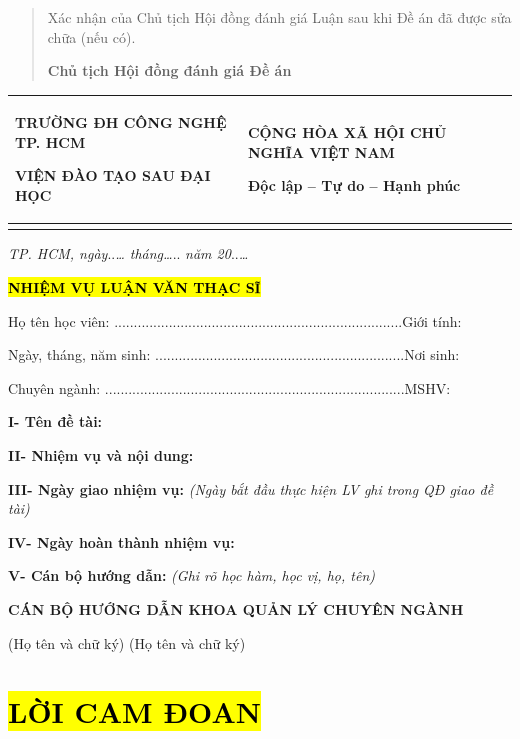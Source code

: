 \documentclass[
]{article}
\newcounter{none} %
\begin{document}
\begin{quote}
Xác nhận của Chủ tịch Hội đồng đánh giá Luận sau khi Đề án đã được sửa
chữa (nếu có).

\textbf{Chủ tịch Hội đồng đánh giá Đề án}
\end{quote}

{\def\LTcaptype{none} %
\begin{longtable}[]{@{}
  >{\raggedright\arraybackslash}p{}
  >{\raggedright\arraybackslash}p{}@{}}
\toprule\noalign{}
\begin{minipage}[b]{\linewidth}\centering
TRƯỜNG ĐH CÔNG NGHỆ TP. HCM

\textbf{VIỆN ĐÀO TẠO SAU ĐẠI HỌC}
\end{minipage} & \begin{minipage}[b]{\linewidth}\centering
\textbf{CỘNG HÒA XÃ HỘI CHỦ NGHĨA VIỆT NAM}

\textbf{Độc lập -- Tự do -- Hạnh phúc}
\end{minipage} \\
\midrule\noalign{}
\endhead
\bottomrule\noalign{}
\endlastfoot
\end{longtable}
}

\emph{TP. HCM, ngày}..\emph{\ldots{} tháng\ldots{}}.. \emph{năm
20}..\emph{\ldots{}}

\textbf{\hl{NHIỆM VỤ LUẬN VĂN THẠC SĨ}}

Họ tên học viên:
..........................................................................Giới
tính:

Ngày, tháng, năm sinh:
................................................................Nơi
sinh:

Chuyên ngành:
.............................................................................MSHV:

\textbf{I- Tên đề tài:}

\textbf{II- Nhiệm vụ và nội dung:}

\textbf{III- Ngày giao nhiệm vụ:} \emph{(Ngày bắt đầu thực hiện LV ghi
trong QĐ giao đề tài)}

\textbf{IV- Ngày hoàn thành nhiệm vụ:}

\textbf{V- Cán bộ hướng dẫn:} \emph{(Ghi rõ học hàm, học vị, họ, tên)}

\textbf{CÁN BỘ HƯỚNG DẪN KHOA QUẢN LÝ CHUYÊN NGÀNH}

(Họ tên và chữ ký) (Họ tên và chữ ký)

\section{\texorpdfstring{\hl{LỜI CAM
ĐOAN}}{LỜI CAM ĐOAN}}\label{lux1eddi-cam-ux111oan}
\end{document}

